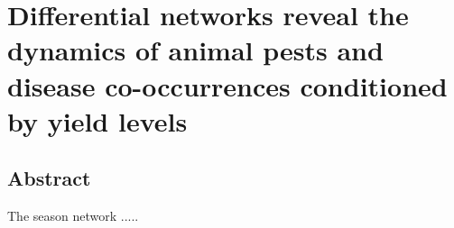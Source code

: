 \section{Differential networks reveal the dynamics of animal pests and disease co-occurrences conditioned by yield levels}


\subsection{Abstract}
The season network ..... 
